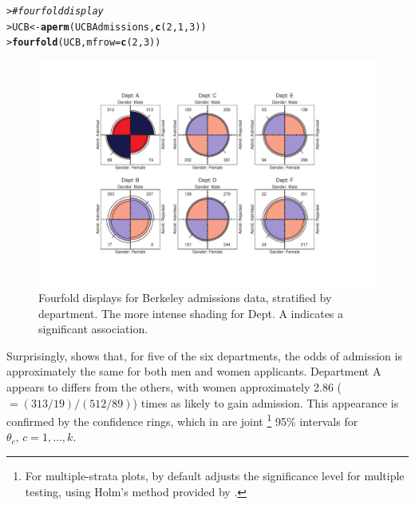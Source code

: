\documentclass[10pt,krantz2]{krantz}\usepackage[]{graphicx}\usepackage[]{color}
\makeatletter
\newcommand{\hlnum}[1]{\textcolor[rgb]{0.686,0.059,0.569}{#1}}%
\newcommand{\hlcom}[1]{\textcolor[rgb]{0.678,0.584,0.686}{\textit{#1}}}%
\newcommand{\hlstd}[1]{\textcolor[rgb]{0.345,0.345,0.345}{#1}}%
\newcommand{\hlkwb}[1]{\textcolor[rgb]{0.69,0.353,0.396}{#1}}%
\newcommand{\hlkwc}[1]{\textcolor[rgb]{0.333,0.667,0.333}{#1}}%
\newcommand{\hlkwd}[1]{\textcolor[rgb]{0.737,0.353,0.396}{\textbf{#1}}}%
\newenvironment{kframe}{%
 \def\at@end@of@kframe{}%
 \ifinner\ifhmode%
  \def\at@end@of@kframe{\end{minipage}}%
  \begin{minipage}{\columnwidth}%
 \fi\fi%
 \def\FrameCommand##1{\hskip\@totalleftmargin \hskip-\fboxsep
 \colorbox{shadecolor}{##1}\hskip-\fboxsep
     \hskip-\linewidth \hskip-\@totalleftmargin \hskip\columnwidth}%
 \MakeFramed {\advance\hsize-\width
   \@totalleftmargin\z@ \linewidth\hsize
   \@setminipage}}%
 {\par\unskip\endMakeFramed%
 \at@end@of@kframe}
\newenvironment{knitrout}{}{} %
\renewenvironment{knitrout}{\small\renewcommand{\baselinestretch}{.85}}{} %
\makeatother
\begin{document}
\begin{knitrout}
\color{fgcolor}\begin{kframe}
\begin{alltt}
\hlstd{> }\hlcom{# fourfold display}
\hlstd{> }\hlstd{UCB} \hlkwb{<-} \hlkwd{aperm}\hlstd{(UCBAdmissions,} \hlkwd{c}\hlstd{(}\hlnum{2}\hlstd{,} \hlnum{1}\hlstd{,} \hlnum{3}\hlstd{))}
\hlstd{> }\hlkwd{fourfold}\hlstd{(UCB,} \hlkwc{mfrow} \hlstd{=} \hlkwd{c}\hlstd{(}\hlnum{2}\hlstd{,} \hlnum{3}\hlstd{))}
\end{alltt}
\end{kframe}\begin{figure}[!htbp]

\centerline{\includegraphics[width=.95\textwidth,trim=80 50 80 50]{ch04/fig/berk-fourfold4-1} }

\caption[Fourfold displays for Berkeley admissions data, stratified by department]{Fourfold displays for Berkeley admissions data, stratified by department. The more intense shading for Dept. A indicates a significant association.}\label{fig:berk-fourfold4}
\end{figure}


\end{knitrout}

Surprisingly,  shows that, for five of the
six departments, the odds of admission is approximately the same for
both men and women applicants.  Department A appears to differs from
the others, with women approximately 2.86 (\(=  ( 313/19 )  /
(512/89)\)) times as likely to gain admission.  This appearance is
confirmed by the confidence rings, which in 
are joint%
\footnote{
For multiple-strata plots,  by default adjusts the
significance level for multiple testing, using Holm's
\citeyearpar{Holm:1979} method
provided by .
}
95\% intervals for \(\theta_c ,  \,  c = 1, \dots ,
k\).
\end{document}
